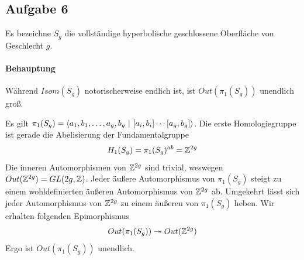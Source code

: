 \documentclass{book}
\begin{document}
\subsection{Aufgabe 6}
Es bezeichne $S_g$ die vollständige hyperbolische geschlossene Oberfläche von Geschlecht $g$.
\paragraph{Behauptung}
Während $Isom(S_g)$ notorischerweise endlich ist, ist $Out(\pi_1(S_g))$ unendlich groß.
\begin{Beweis}{}
	Es gilt $\pi_1(S_g) = \left<a_1,b_1, \ldots, a_g,b_g~|~ [a_i,b_i]\cdots [a_g,b_g] \right>$. Die erste Homologiegruppe ist gerade die Abelisierung der Fundamentalgruppe
	\[ H_1(S_g) = \pi_1(S_g)^{ab} = \mathbb{Z}^{2g} \]
Die inneren Automorphismen von $\mathbb{Z}^{2g}$ sind trivial, weswegen $Out(\mathbb{Z}^{2g}) = GL(2g,\mathbb{Z})$. Jeder äußere Automorphismus von $\pi_1(S_g)$ steigt zu einem wohldefinierten äußeren Automorphismus von $\mathbb{Z}^{2g}$ ab. Umgekehrt lässt sich jeder Automorphismus von $\mathbb{Z}^{2g}$ zu einem äußeren von $\pi_1(S_g)$ heben. Wir erhalten folgenden Epimorphismus
\[ Out(\pi_1(S_g)) \overset{}{\twoheadrightarrow} Out(\mathbb{Z}^{2g}) \]
Ergo ist $Out(\pi_1(S_g))$ unendlich.
\end{Beweis}

\printindex
\end{document}
